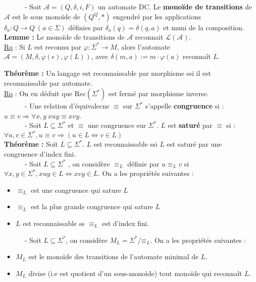 \documentclass[11pt,a4paper]{article}
\begin{document}
\ \ \ \ \ \ - Soit $\mathcal{A} = (Q,\delta, i, F)$ un automate DC. Le \textbf{monoïde de transitions} de $\mathcal{A}$ est le sous monoïde de $(Q^Q,*)$ engendré par les applications $\delta_a : Q \to Q \ (a \in \Sigma) $ définies par $\delta_a(q)=\delta(q,a)$ et muni de la composition. \\

\textbf{Lemme :} Le monoïde de transitions de $\mathcal{A}$ reconnait $\mathcal{L}(\mathcal{A})$. \\

\underline{Rq} : Si $L$ est reconnu par $\varphi : \Sigma^* \to M$, alors l'automate $\mathcal{A}=(M,\delta,\varphi(\epsilon),\varphi(L))$, avec $\delta(m,a) := m \cdot \varphi(a)$ reconnaît $L$.

\textbf{Théorème :} Un langage est reconnaissable par morphisme ssi il est reconnaissable par automate. \\

\underline{Rq} : On en déduit que Rec$(\Sigma^*)$ est fermé par morphisme inverse. \\

\ \ \ \ \ \ - Une relation d'équivalecne $\equiv$ sur $\Sigma^*$ s'appelle \textbf{congruence} si : $u \equiv v \Rightarrow \forall x,y \ xuy \equiv xvy$. \\

\ \ \ \ \ \ - Soit $L \subseteq \Sigma^*$ et $\equiv$ une congruence sur $\Sigma^*$. $L$ est \textbf{saturé} par $\equiv$ si : $\forall u,v \in \Sigma^*, u \equiv v \Rightarrow (u\in L \Leftrightarrow v \in L)$ \\

\textbf{Théorème :} Soit $L \subseteq \Sigma^*$. $L$ est reconnaissable ssi $L$ est saturé par une congruence d'index fini. \\

\ \ \ \ \ \ - Soit $L \subseteq \Sigma^*$ , on considère $\equiv_L$ définie par $u \equiv_L v$ si $\forall x,y \in\Sigma^*, xuy \in L \Leftrightarrow xvy \in L$. On a les propriétés suivantes :
\begin{itemize}
\item $\equiv_L$ est une congruence qui sature $L$
\item  $\equiv_L$ est la plus grande congruence qui sature $L$
\item $L$ est reconnaissable ss $\equiv_L$ est d'index fini. \\
\end{itemize}

\ \ \ \ \ \ - Soit $L \subseteq \Sigma^*$, on considère $M_L = \Sigma^*/\mathord\equiv_L$. On a les propriétés suivantes :
\begin{itemize}
\item $M_L$ est le monoïde des transitions de l'automate minimal de $L$.
\item $M_L$ divise (i.e est quotient d'un sous-monoïde) tout monoïde qui reconnaît $L$.
\end{itemize}
\end{document}

